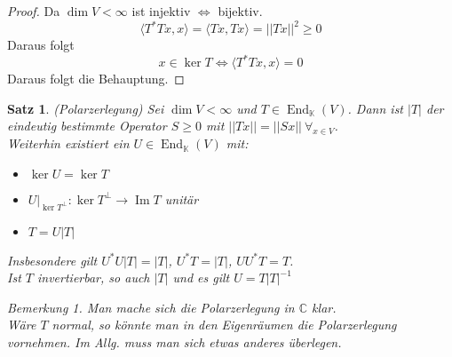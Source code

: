 \documentclass[12pt,a4paper]{article}
\newtheorem{theorem}{Satz}
\theoremstyle{definition}
\theoremstyle{remark}
\newtheorem*{remark}{Bemerkung}
\DeclareMathOperator{\Img}{Im}
\DeclareMathOperator{\End}{End}
\begin{document}
	\begin{proof}
		Da $\dim V < \infty$ ist injektiv $\Leftrightarrow$ bijektiv. \\
		\begin{equation}
			\langle T^*Tx,x \rangle = \langle Tx,Tx \rangle = ||Tx||^2 \geq 0
		\end{equation}
		Daraus folgt
		\begin{equation}
			x \in \ker T \Leftrightarrow \langle T^*Tx,x \rangle = 0
		\end{equation}
		Daraus folgt die Behauptung.
	\end{proof}
	\newpage
	\begin{theorem}{(Polarzerlegung)}
		Sei $\dim V < \infty$ und $T \in \End_{\mathbb{K}}(V)$. Dann ist $|T|$ der eindeutig bestimmte Operator $S \geq 0$ mit $||Tx||=||Sx|| \ \forall_{x \in V}$. \\
		Weiterhin existiert ein $U \in \End_{\mathbb{K}}(V)$ mit:
		\begin{itemize}
			\item $\ker U=\ker T$ 
			\item $U|_{\ker T^{\bot}}: \ker T^{\bot} \rightarrow \Img T$ unitär
			\item $T=U|T|$
		\end{itemize}
		Insbesondere gilt $U^*U|T|=|T|$, $U^*T=|T|$, $UU^*T=T$. \\
		Ist $T$ invertierbar, so auch $|T|$ und es gilt $U = T|T|^{-1}$
		\begin{remark}
			Man mache sich die Polarzerlegung in $\mathbb{C}$ klar. \\
			Wäre $T$ normal, so könnte man in den Eigenräumen die Polarzerlegung vornehmen. Im Allg. muss man sich etwas anderes überlegen.
		\end{remark}
	\end{theorem}
\end{document}
